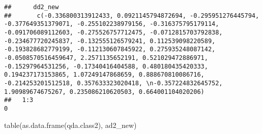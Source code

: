 \documentclass[
  11pt,
]{article}
\newenvironment{Shaded}{\begin{snugshade}}{\end{snugshade}}
\newcommand{\FunctionTok}[1]{\textcolor[rgb]{0.00,0.00,0.00}{#1}}
\newcommand{\NormalTok}[1]{#1}
\begin{document}
\begin{verbatim}
##      dd2_new
##       c(-0.336800313912433, 0.0921145794872694, -0.295951276445794, -0.377649351379071, -0.255102238979156, -0.316375795179114, -0.091706089112603, -0.275526757712475, -0.0712815703792838, -0.234677720245837, -0.132555126579241, 0.112539098220589, -0.193828682779199, -0.112130607845922, 0.275935248087142, -0.0508570516459647, 2.2571135652191, 0.521029472886971, -0.15297964531256, -0.17340416404588, 0.480180435420333, 0.194237173153865, 1.07249147868659, 0.888670810086716, -0.214253201512518, 0.357633323020418, \n-0.357224832645752, 1.90989674675267, 0.235086210620503, 0.664001104020206)
##   1:3                                                                                                                                                                                                                                                                                                                                                                                                                                                                                                                                                                                                           0
\end{verbatim}

\begin{Shaded}
\begin{Highlighting}[]
\FunctionTok{table}\NormalTok{(}\FunctionTok{as.data.frame}\NormalTok{(qda.class2), ad2\_new)}
\end{Highlighting}
\end{Shaded}
\end{document}
